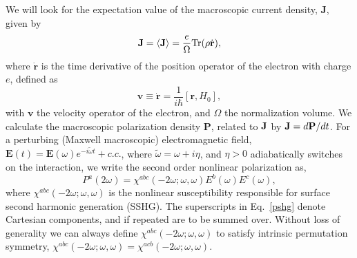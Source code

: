 \documentclass[floatfix,prb,aps,superscriptaddress,11pt,preprint,letterpaper]{revtex4}
\def\chon{red}
\begin{document}
We will look for the expectation value of the macroscopic current density, 
$\mathbf{J}$, given by 
\begin{equation}
\mathbf{J}=\langle{\mathbf{J}}\rangle=\frac{e}{\Omega}\mbox{Tr}({\rho}\dot{\mathbf{r}})
,
\label{pe}
\end{equation}
where $\dot{\mathbf{r}}$ is the time derivative of the position operator of the
electron {\color{\chon} with} charge $e$, {\color{\chon} defined as}
\begin{equation}
\mathbf{v}\equiv \dot{\mathbf{r}}=\frac{1}{i\hbar }[\mathbf{r},H_0],  
\label{mv}
\end{equation}
with $\mathbf{v}$ the velocity operator of the electron, and $\Omega$ the
normalization volume. We calculate the macroscopic polarization density 
$\mathbf{P}$, related to $\mathbf{J}$ by
$\mathbf{J}=d\mathbf{P}/dt$. For a 
perturbing (Maxwell macroscopic) electromagnetic field, $\mathbf{E}(t)=
\mathbf{E}(\omega )e^{-i\tilde{\omega} t}+c.c.$,
where $\tilde\omega=\omega+i\eta $,
and $\eta >0$ {\color{\chon} adiabatically switches on} the interaction,
we write the second order nonlinear
polarization as, 
\begin{equation}
P^a(2\omega)=\chi ^{abc}(-2\omega;\omega,\omega)E^{b}(\omega)E^{c}(\omega),  
\label{pshg}
\end{equation}
where $\chi^{abc}(-2\omega ;\omega ,\omega )$ is the nonlinear
susceptibility responsible {\color{\chon} for} surface second harmonic generation
(SSHG). 
The 
superscripts in Eq.~\eqref{pshg} denote Cartesian components, and if
repeated are to be summed over. Without loss of generality we can always
define $\chi^{abc}(-2\omega;\omega,\omega)$
 to satisfy intrinsic permutation
symmetry, 
$\chi^{abc}(-2\omega ;\omega ,\omega )=\chi ^{acb}(-2\omega ;\omega
,\omega )$.
\end{document}

